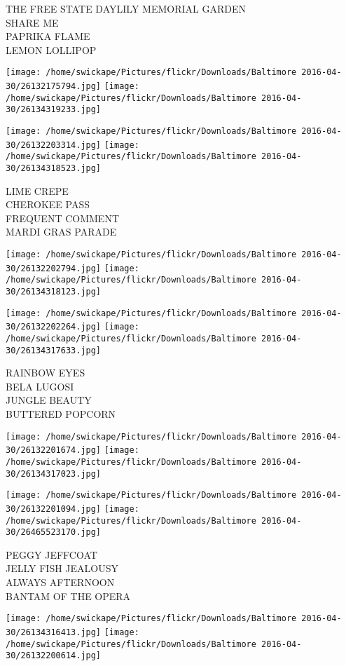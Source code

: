 \documentclass[10pt,letterpaper]{article}
\begin{document}
THE FREE STATE DAYLILY MEMORIAL GARDEN\\
SHARE ME\\
PAPRIKA FLAME\\
LEMON LOLLIPOP
\pagebreak

\texttt{[image: /home/swickape/Pictures/flickr/Downloads/Baltimore 2016-04-30/26132175794.jpg]}
\texttt{[image: /home/swickape/Pictures/flickr/Downloads/Baltimore 2016-04-30/26134319233.jpg]}

\texttt{[image: /home/swickape/Pictures/flickr/Downloads/Baltimore 2016-04-30/26132203314.jpg]}
\texttt{[image: /home/swickape/Pictures/flickr/Downloads/Baltimore 2016-04-30/26134318523.jpg]}

LIME CREPE\\
CHEROKEE PASS\\
FREQUENT COMMENT\\
MARDI GRAS PARADE
\pagebreak

\texttt{[image: /home/swickape/Pictures/flickr/Downloads/Baltimore 2016-04-30/26132202794.jpg]}
\texttt{[image: /home/swickape/Pictures/flickr/Downloads/Baltimore 2016-04-30/26134318123.jpg]}

\texttt{[image: /home/swickape/Pictures/flickr/Downloads/Baltimore 2016-04-30/26132202264.jpg]}
\texttt{[image: /home/swickape/Pictures/flickr/Downloads/Baltimore 2016-04-30/26134317633.jpg]}

RAINBOW EYES\\
BELA LUGOSI\\
JUNGLE BEAUTY\\
BUTTERED POPCORN
\pagebreak

\texttt{[image: /home/swickape/Pictures/flickr/Downloads/Baltimore 2016-04-30/26132201674.jpg]}
\texttt{[image: /home/swickape/Pictures/flickr/Downloads/Baltimore 2016-04-30/26134317023.jpg]}

\texttt{[image: /home/swickape/Pictures/flickr/Downloads/Baltimore 2016-04-30/26132201094.jpg]}
\texttt{[image: /home/swickape/Pictures/flickr/Downloads/Baltimore 2016-04-30/26465523170.jpg]}

PEGGY JEFFCOAT\\
JELLY FISH JEALOUSY\\
ALWAYS AFTERNOON\\
BANTAM OF THE OPERA
\pagebreak

\texttt{[image: /home/swickape/Pictures/flickr/Downloads/Baltimore 2016-04-30/26134316413.jpg]}
\texttt{[image: /home/swickape/Pictures/flickr/Downloads/Baltimore 2016-04-30/26132200614.jpg]}
\end{document}
